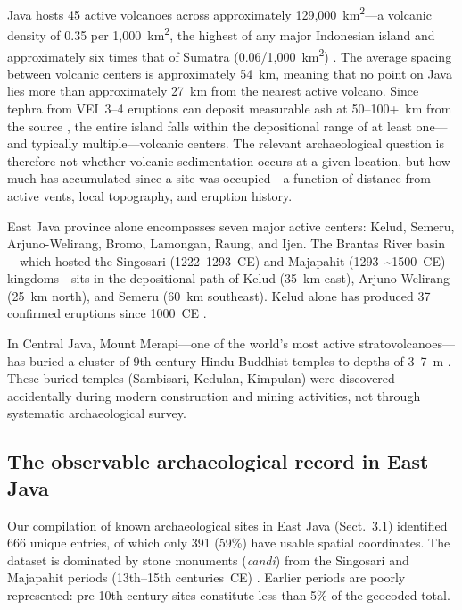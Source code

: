 \documentclass[12pt,a4paper]{article}
\begin{document}
Java hosts 45 active volcanoes across approximately 129,000~km\textsuperscript{2}---a volcanic density of 0.35 per 1,000~km\textsuperscript{2}, the highest of any major Indonesian island and approximately six times that of Sumatra (0.06/1,000~km\textsuperscript{2}) \citep{vanbemmelen1949}. The average spacing between volcanic centers is approximately 54~km, meaning that no point on Java lies more than approximately 27~km from the nearest active volcano. Since tephra from VEI~3--4 eruptions can deposit measurable ash at 50--100+~km from the source \citep{newhall1982}, the entire island falls within the depositional range of at least one---and typically multiple---volcanic centers. The relevant archaeological question is therefore not whether volcanic sedimentation occurs at a given location, but how much has accumulated since a site was occupied---a function of distance from active vents, local topography, and eruption history.

East Java province alone encompasses seven major active centers: Kelud, Semeru, Arjuno-Welirang, Bromo, Lamongan, Raung, and Ijen. The Brantas River basin---which hosted the Singosari (1222--1293~CE) and Majapahit (1293--\textasciitilde1500~CE) kingdoms---sits in the depositional path of Kelud (35~km east), Arjuno-Welirang (25~km north), and Semeru (60~km southeast). Kelud alone has produced 37 confirmed eruptions since 1000~CE \citep{gvp2024,maeno2019}.

In Central Java, Mount Merapi---one of the world's most active stratovolcanoes---has buried a cluster of 9th-century Hindu-Buddhist temples to depths of 3--7~m \citep{lavigne2000,thouret2000}. These buried temples (Sambisari, Kedulan, Kimpulan) were discovered accidentally during modern construction and mining activities, not through systematic archaeological survey.

\subsection{The observable archaeological record in East Java}

Our compilation of known archaeological sites in East Java (Sect.~3.1) identified 666 unique entries, of which only 391 (59\%) have usable spatial coordinates. The dataset is dominated by stone monuments (\textit{candi}) from the Singosari and Majapahit periods (13th--15th centuries~CE) \citep{kinney2003}. Earlier periods are poorly represented: pre-10th century sites constitute less than 5\% of the geocoded total.
\end{document}
